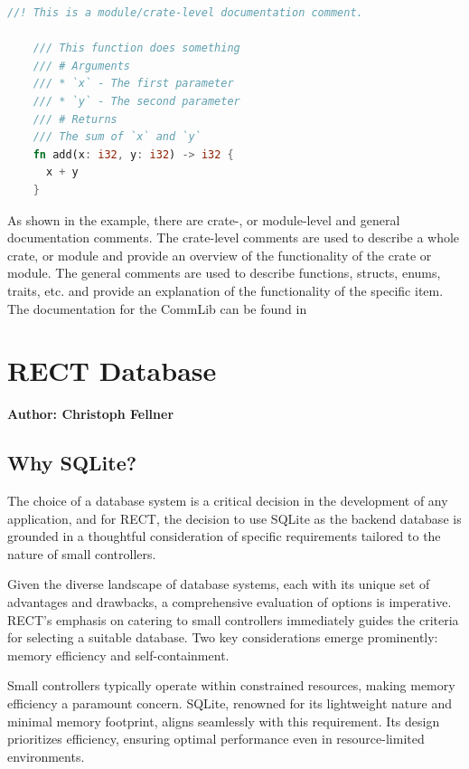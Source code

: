 \begin{minipage}{\textwidth}
  \begin{lstlisting}[language=Rust, caption=Example of a Documentation Comment]
    //! This is a module/crate-level documentation comment.

    /// This function does something
    /// # Arguments
    /// * `x` - The first parameter
    /// * `y` - The second parameter
    /// # Returns
    /// The sum of `x` and `y`
    fn add(x: i32, y: i32) -> i32 {
      x + y
    }
  \end{lstlisting}
\end{minipage}

As shown in the example, there are crate-, or module-level and general documentation comments. 
The crate-level comments are used to describe a whole crate, or module and provide an overview of the functionality of the crate or module.
The general comments are used to describe functions, structs, enums, traits, etc. and provide 
an explanation of the functionality of the specific item. The documentation for the CommLib can be found in %

\section{RECT Database}
\textbf{Author: Christoph Fellner}

\subsection{Why SQLite?}
The choice of a database system is a critical decision in the development of any application, and for RECT, the decision to use SQLite as the backend database 
is grounded in a thoughtful consideration of specific requirements tailored to the nature of small controllers.\newline

Given the diverse landscape of database systems, each with its unique set of advantages and drawbacks, a comprehensive evaluation of options is imperative. 
RECT's emphasis on catering to small controllers immediately guides the criteria for selecting a suitable database. Two key considerations emerge prominently: 
memory efficiency and self-containment.\newline

Small controllers typically operate within constrained resources, making memory efficiency a paramount concern. SQLite, renowned for its lightweight nature and 
minimal memory footprint, aligns seamlessly with this requirement. Its design prioritizes efficiency, ensuring optimal performance even in resource-limited 
environments.\newline

